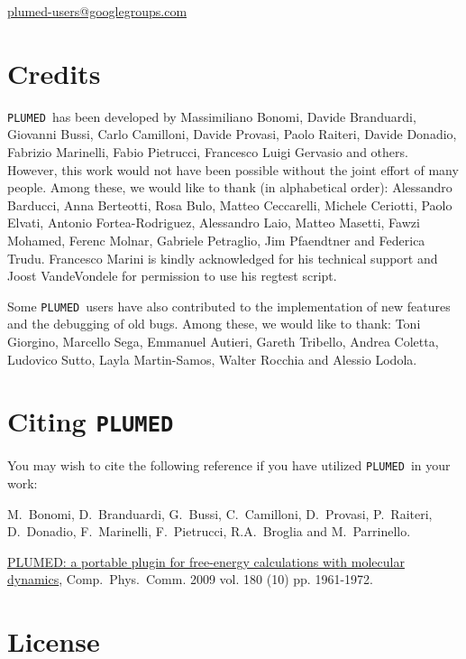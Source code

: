 \documentclass[12pt,fleqn]{report}
\newcommand{\plumed}{{\tt PLUMED}}
\begin{document}
\begin{center}
\href{mailto:plumed-users@googlegroups.com}{plumed-users@googlegroups.com}
\end{center}

\section{Credits}
\plumed \ has been developed  by 
Massimiliano Bonomi, Davide Branduardi, Giovanni Bussi, Carlo Camilloni, 
Davide Provasi, Paolo Raiteri,
Davide Donadio, Fabrizio Marinelli, Fabio Pietrucci, 
 Francesco Luigi Gervasio and others.
However, this work would not have been possible without the joint effort of many people. 
Among these, we would like to thank (in alphabetical order):
Alessandro Barducci, Anna Berteotti, Rosa Bulo, Matteo Ceccarelli, Michele Ceriotti, Paolo Elvati,  Antonio Fortea-Rodriguez, 
Alessandro Laio, Matteo Masetti, Fawzi Mohamed, Ferenc Molnar, Gabriele Petraglio, Jim Pfaendtner and Federica Trudu. 
Francesco Marini is kindly acknowledged for his technical support and Joost
VandeVondele for  permission to use his regtest script.

Some \plumed \ users have also contributed to the implementation
of new features and the debugging of old bugs. Among these, we would like to thank:
Toni Giorgino, Marcello Sega, Emmanuel Autieri, Gareth Tribello, Andrea Coletta, Ludovico Sutto, Layla Martin-Samos, Walter Rocchia and Alessio Lodola.

\section{Citing \plumed}
\label{sec.citing}
You may wish to cite the following reference if you have utilized \plumed \ in your work:

M.~Bonomi, D.~Branduardi, G.~Bussi, C.~Camilloni, D.~Provasi, P.~Raiteri, 
D.~Donadio, F.~Marinelli, F.~Pietrucci, R.A.~Broglia and M.~Parrinello.

\href{http://dx.doi.org/10.1016/j.cpc.2009.05.011}{PLUMED: a portable plugin for free-energy calculations with molecular dynamics},
 Comp.~Phys.~Comm. 2009 vol. 180 (10) pp. 1961-1972. 


\section{License}
\end{document}
